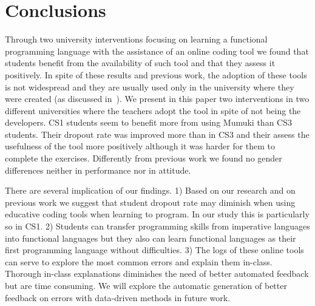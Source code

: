 \section{Conclusions} \label{conclusion}



Through two university interventions focusing on learning a functional programming language with the assistance of an online coding tool we found that students benefit from the availability of such tool and that they assess it positively. In spite of these results and previous work, the adoption of these tools is not widespread and they are usually used only in the university where they were created (as discussed in~\cite{brusilovsky2014increasing}). We present in this paper two interventions in two different universities where the teachers adopt the tool in spite of not being the developers.
CS1 students seem to benefit more from using Mumuki than CS3 students. Their dropout rate was improved more than in CS3 and their assess the usefulness of the tool more positively although it was harder for them to complete the exercises. Differently from previous work we found no gender differences neither in performance nor in attitude. 
 
There are several implication of our findings. 1) Based on our research and on previous work we suggest that student dropout rate may diminish when using educative coding tools when learning to program. In our study this is particularly so in CS1. 2) Students can transfer programming skills from imperative languages into functional languages but they also can learn functional languages as their first programming language without difficulties. 3) The logs of these online tools can serve to explore the most common errors and explain them in-class. Thorough in-class explanations diminishes the need of better automated feedback but are time consuming. We will explore the automatic generation of better feedback on errors with data-driven methods in future work. 


 

